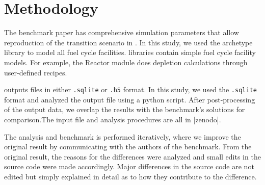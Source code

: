 \section{Methodology}

The benchmark paper \cite{feng_standardized_2016}
has comprehensive simulation parameters that allow
reproduction of the transition scenario in \Cyclus.
In this study, we used the \Cycamore \cite{huff_fundamental_2016}
 archetype library to model
all fuel cycle facilities. \Cycamore libraries contain
simple fuel cycle facility models. For example,
the Reactor module does depletion calculations through
user-defined recipes.

\Cyclus outputs files in either \texttt{.sqlite} or
\texttt{.h5} format. In this study, we used the
\texttt{.sqlite} format and analyzed the output file
using a python script. After post-processing of the
output data, we overlap the results with the
benchmark's solutions for comparison.The input file
and analysis procedures are all in [zenodo].

The analysis and benchmark is performed iteratively,
where we improve the original result by communicating
with the authors of the benchmark. From the original result,
the reasons for the differences were analyzed and
small edits in the source code were made accordingly.
Major differences in the source code are not edited but
simply explained in detail as to how they contribute
to the difference.
